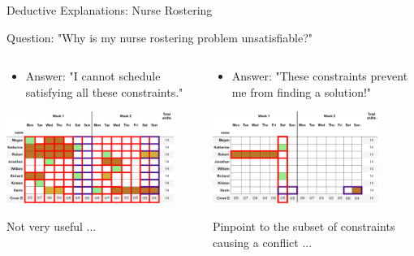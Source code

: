 \documentclass{cons-beamer}
\begin{document}
\begin{frame}{Deductive Explanations: Nurse Rostering}
  \begin{center}
    Question: "Why is my nurse rostering problem unsatisfiable?"
  \end{center}
  \begin{columns}
    \begin{column}{0.5\textwidth}
      \begin{itemize}
        \item Answer: "I cannot schedule satisfying all these constraints."
      \end{itemize}
      \begin{center}
        \includegraphics[height=30mm]{images/texpl_img/nr_all.png}
      \end{center}

      Not very useful ...
      \vfill
    \end{column}    
    \begin{column}{0.5\textwidth}
      \begin{itemize}  
        \item Answer: "These constraints prevent me from finding a solution!"
      \end{itemize}
      \begin{center}
        \includegraphics[height=30mm]{images/texpl_img/nr_mus.png}
      \end{center}

      Pinpoint to the subset of constraints causing a conflict ... 
      \vfill
    \end{column}    
  \end{columns}
\end{frame}
\end{document}
